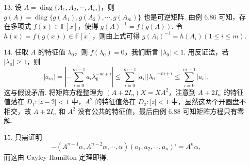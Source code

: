 \documentclass[UTF8,12pt,a4paper,fontset=fandol]{ctexart}
\begin{document}
13. 设 $A=\operatorname{diag}\{A_1,A_2,\cdots,A_m\}$，则 $g(A)=\operatorname{diag}\{g(A_1),g(A_2),\cdots,g(A_m)\}$ 也是可逆矩阵. 由例 6.86 可知，存在多项式 $f(x)\in\mathbb{F}[x]$，使得 $g(A)^{-1}=f(g(A))$. 令 $h(x)=f(g(x))\in\mathbb{F}[x]$，则由上式可得 $g(A_i)^{-1}=h(A_i)(1\le i\le m)$.

14. 任取 $A$ 的特征值 $\lambda_0$，则 $f(\lambda_0)=0$，我们断言 $|\lambda_0|<1$. 用反证法，若 $|\lambda_0|\ge 1$，则
\[
|a_m|=\left|-\sum_{i=0}^{m-1}a_i\lambda_0^{-m+i}\right|\le \sum_{i=0}^{m-1}|a_i||\lambda_0|^{-m+i}\le\sum_{i=0}^{m-1}|a_i|,
\]
这与假设矛盾. 将矩阵方程整理为 $(A+2I_n)X=XA^2$，注意到 $A+2I_n$ 的特征值落在 $D_1:|z-2|<1$ 中，$A^2$ 的特征值落在 $D_2:|z|<1$ 中，显然这两个开圆盘不相交，故 $A+2I_n$ 和 $A^2$ 没有公共的特征值，最后由例 6.88 可知矩阵方程只有零解.

15. 只需证明
\[
-(A^{n-1}\alpha,A^{n-2}\alpha,\cdots,\alpha)(a_1,a_2,\cdots,a_n)'=A^n\alpha,
\]
而这由 Cayley-Hamilton 定理即得.
\end{document}
